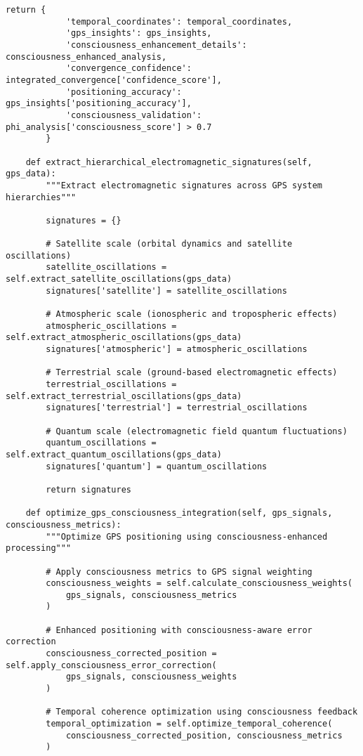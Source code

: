 \documentclass[12pt,a4paper]{article}
\begin{document}
\begin{lstlisting}[style=pythonstyle, caption=Guruza Convergence with Sighthound Consciousness Integration]
        return {
            'temporal_coordinates': temporal_coordinates,
            'gps_insights': gps_insights,
            'consciousness_enhancement_details': consciousness_enhanced_analysis,
            'convergence_confidence': integrated_convergence['confidence_score'],
            'positioning_accuracy': gps_insights['positioning_accuracy'],
            'consciousness_validation': phi_analysis['consciousness_score'] > 0.7
        }
    
    def extract_hierarchical_electromagnetic_signatures(self, gps_data):
        """Extract electromagnetic signatures across GPS system hierarchies"""
        
        signatures = {}
        
        # Satellite scale (orbital dynamics and satellite oscillations)
        satellite_oscillations = self.extract_satellite_oscillations(gps_data)
        signatures['satellite'] = satellite_oscillations
        
        # Atmospheric scale (ionospheric and tropospheric effects)
        atmospheric_oscillations = self.extract_atmospheric_oscillations(gps_data)
        signatures['atmospheric'] = atmospheric_oscillations
        
        # Terrestrial scale (ground-based electromagnetic effects)
        terrestrial_oscillations = self.extract_terrestrial_oscillations(gps_data)
        signatures['terrestrial'] = terrestrial_oscillations
        
        # Quantum scale (electromagnetic field quantum fluctuations)
        quantum_oscillations = self.extract_quantum_oscillations(gps_data)
        signatures['quantum'] = quantum_oscillations
        
        return signatures
    
    def optimize_gps_consciousness_integration(self, gps_signals, consciousness_metrics):
        """Optimize GPS positioning using consciousness-enhanced processing"""
        
        # Apply consciousness metrics to GPS signal weighting
        consciousness_weights = self.calculate_consciousness_weights(
            gps_signals, consciousness_metrics
        )
        
        # Enhanced positioning with consciousness-aware error correction
        consciousness_corrected_position = self.apply_consciousness_error_correction(
            gps_signals, consciousness_weights
        )
        
        # Temporal coherence optimization using consciousness feedback
        temporal_optimization = self.optimize_temporal_coherence(
            consciousness_corrected_position, consciousness_metrics
        )
        

\end{lstlisting}
\end{document}
